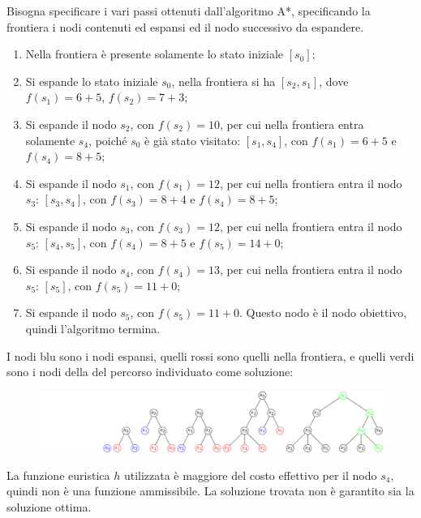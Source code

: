 \documentclass{article}
\numberwithin{equation}{subsection}
\begin{document}
Bisogna specificare i vari passi ottenuti dall'algoritmo A*, specificando la frontiera i nodi contenuti ed espansi ed il nodo successivo 
da espandere.


\begin{enumerate}
    \item Nella frontiera è presente solamente lo stato iniziale $[s_0]$;
    \item Si espande lo stato iniziale $s_0$, nella frontiera si ha $[s_2,s_1]$, dove $f(s_1)=6+5$, $f(s_2)=7+3$;
    \item Si espande il nodo $s_2$, con $f(s_2)=10$, per cui nella frontiera entra solamente $s_4$, poiché $s_0$ è già stato visitato: $[s_1,s_4]$, con $f(s_1)=6+5$ e $f(s_4)=8+5$;
    \item Si espande il nodo $s_1$, con $f(s_1)=12$, per cui nella frontiera entra il nodo $s_3$: $[s_3, s_4]$, con $f(s_3)=8+4$ e $f(s_4)=8+5$;
    \item Si espande il nodo $s_3$, con $f(s_3)=12$, per cui nella frontiera entra il nodo $s_5$: $[s_4, s_5]$, con $f(s_4)=8+5$ e $f(s_5)=14+0$;
    \item Si espande il nodo $s_4$, con $f(s_4)=13$, per cui nella frontiera entra il nodo $s_5$: $[s_5]$, con $f(s_5)=11+0$;
    \item Si espande il nodo $s_5$, con $f(s_5)=11+0$. Questo nodo è il nodo obiettivo, quindi l'algoritmo termina. 
\end{enumerate}

I nodi blu sono i nodi espansi, quelli rossi sono quelli nella frontiera, e quelli verdi sono i nodi della del percorso individuato come soluzione:

\begin{figure}[H]%
    \centering%
    \includegraphics[trim={4cm 0 0 0},scale=0.9]{albero_esercitazione_1.pdf}%
\end{figure}

La funzione euristica $h$ utilizzata è maggiore del costo effettivo per il nodo $s_4$, quindi non è una funzione ammissibile. La soluzione trovata 
non è garantito sia la soluzione ottima. 
\end{document}
